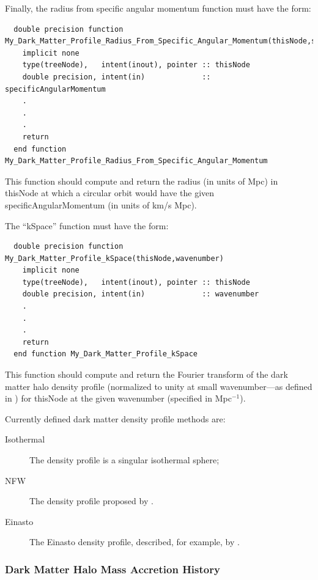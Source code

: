 Finally, the radius from specific angular momentum function must have the form:
\begin{verbatim}
  double precision function My_Dark_Matter_Profile_Radius_From_Specific_Angular_Momentum(thisNode,specificAngularMomentum)
    implicit none
    type(treeNode),   intent(inout), pointer :: thisNode
    double precision, intent(in)             :: specificAngularMomentum
    .
    .
    .
    return
  end function My_Dark_Matter_Profile_Radius_From_Specific_Angular_Momentum
\end{verbatim}
This function should compute and return the radius (in units of Mpc) in {\normalfont \ttfamily thisNode} at which a circular orbit would have the given {\normalfont \ttfamily specificAngularMomentum} (in units of km/s Mpc).

The ``kSpace'' function must have the form:
\begin{verbatim}
  double precision function My_Dark_Matter_Profile_kSpace(thisNode,wavenumber)
    implicit none
    type(treeNode),   intent(inout), pointer :: thisNode
    double precision, intent(in)             :: wavenumber
    .
    .
    .
    return
  end function My_Dark_Matter_Profile_kSpace
\end{verbatim}
This function should compute and return the Fourier transform of the dark matter halo density profile (normalized to unity at small wavenumber---as defined in \citealt{cooray_halo_2002}) for {\normalfont \ttfamily thisNode} at the given {\normalfont \ttfamily wavenumber} (specified in Mpc$^{-1}$).

Currently defined dark matter density profile methods are:
\begin{description}
 \item [{\normalfont \ttfamily Isothermal}] The density profile is a singular isothermal sphere;
 \item [{\normalfont \ttfamily NFW}] The density profile proposed by \cite{navarro_universal_1997}.
 \item [{\normalfont \ttfamily Einasto}] The Einasto density profile, described, for example, by \cite{cardone_spherical_2005}.
\end{description}

\subsubsection{Dark Matter Halo Mass Accretion History}\label{sec:HaloMassAccretionHistory}

